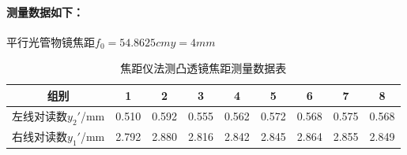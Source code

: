 \documentclass[UTF8]{ctexart}
\begin{document}
\paragraph{测量数据如下：}\quad\par
\begin{center}{平行光管物镜焦距$f_0=54.8625cm$$y=4mm$}\end{center}
\begin{table}[H]\begin{center}
    \caption{焦距仪法测凸透镜焦距测量数据表}
    \begin{tabular}{|c|c|c|c|c|c|c|c|c|}
        \hline
        组别&1&2&3&4&5&6&7&8\\
        \hline
        左线对读数$y_2'$/mm&0.510&0.592&0.555&0.562&0.572&0.568&0.575&0.568\\
        \hline
        右线对读数$y_1'$/mm&2.792&2.880&2.816&2.842&2.845&2.864&2.855&2.849\\
        \hline
    \end{tabular}
\end{center}\end{table}
\end{document}
